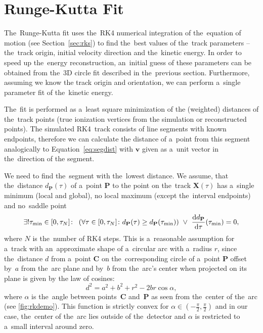 	\section{Runge-Kutta Fit}
	\label{sec:rkfit}
		The~Runge-Kutta fit uses the~\acf{RK4} numerical integration of the~equation of motion (see Section~\ref{sec:rks}) to find the~best values of the~track parameters -- the~track origin, initial velocity direction and the~kinetic energy. In order to speed up the~energy reconstruction, an~initial guess of these parameters can be obtained from the~3D circle fit described in the~previous section. Furthermore, assuming we know the track origin and orientation, we can perform a~single parameter fit of the~kinetic energy.
		
		The~fit is performed as a~least square minimization of the (weighted) distances of the~track points (true ionization vertices from the simulation or reconstructed points). The simulated \ac{RK4}~track consists of line segments with known endpoints, therefore we can calculate the distance of a~point from this segment analogically to Equation~\ref{eq:segdist} with $\mathbf{v}$ given as a~unit vector in the~direction of the segment.
		
		We need to find the~segment with the~lowest distance. We assume, that the~distance $d_\mathbf{P}(\tau)$ of a~point $\mathbf{P}$ to the point on the~track $\mathbf{X}(\tau)$ has a~single minimum (local and global), no local maximum (except the~interval endpoints) and no~saddle point
			\begin{equation}
				\label{eq:rk_assum}
				\exists!\tau_\text{min}\in[0,\tau_N]\colon\ \left(\forall\tau\in[0,\tau_N]\colon  d_{\mathbf{P}}(\tau) \geq d_{\mathbf{P}}(\tau_\text{min})\right)\ \lor\ \dv{d_{\mathbf{P}}}{\tau}{(\tau_\text{min})} = 0,
			\end{equation}
		where $N$ is the~number of \ac{RK4} steps. This is a~reasonable assumption for a~track with an~approximate shape of a~circular arc with a~radius $r$, since the~distance $d$ from a~point $\mathbf{C}$ on the~corresponding circle of a~point $\mathbf{P}$ offset by~$a$ from the~arc plane and by~$b$ from the~arc's center when projected on its plane is given by the law of cosines:
			\begin{equation}
				\label{eq:rkdemo}
				d^2 = a^2+b^2+r^2 - 2br\cos\alpha,
			\end{equation}
		where $\alpha$ is the~angle between points~$\mathbf{C}$ and~$\mathbf{P}$ as seen from the~center of the~arc (see \cref{fig:rkdemo}). This function is strictly convex for $\alpha\in\left(-\frac{\pi}{2},\frac{\pi}{2}\right)$ and in our case, the~center of the~arc lies outside of the~detector and $\alpha$ is restricted to a~small interval around zero.
		
